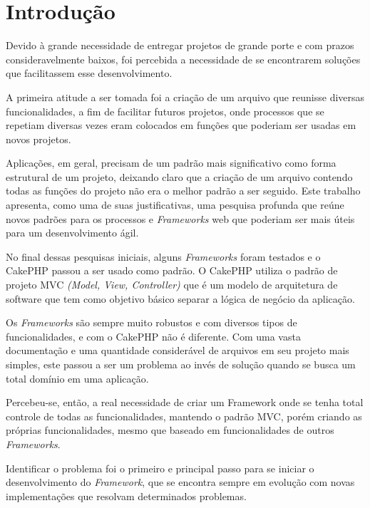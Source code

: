 \chapter{Introdução\label{cap:introducao}}
    Devido à grande necessidade de entregar projetos de grande porte e com prazos consideravelmente baixos, foi percebida a necessidade de se encontrarem soluções que facilitassem esse desenvolvimento.

    A primeira atitude a ser tomada foi a criação de um arquivo que reunisse diversas funcionalidades, a fim de facilitar futuros projetos, onde processos que se repetiam diversas vezes eram colocados em funções que poderiam ser usadas em novos projetos.

    Aplicações, em geral, precisam de um padrão mais significativo como forma estrutural de um projeto, deixando claro que a criação de um arquivo contendo todas as funções do projeto não era o melhor padrão a ser seguido. Este trabalho apresenta, como uma de suas justificativas, uma pesquisa profunda que reúne novos padrões para os processos e \emph{Frameworks} web que poderiam ser mais úteis para um desenvolvimento ágil.

    No final dessas pesquisas iniciais, alguns \emph{Frameworks} foram testados e o CakePHP passou a ser usado como padrão. O CakePHP utiliza o padrão de projeto MVC \emph{(Model, View, Controller)} que é um modelo de arquitetura de software que tem como objetivo básico separar a lógica de negócio da aplicação.

    Os \emph{Frameworks} são sempre muito robustos e com diversos tipos de funcionalidades, e com o CakePHP não é diferente. Com uma vasta documentação e uma quantidade considerável de arquivos em seu projeto mais simples, este passou a ser um problema ao invés de solução quando se busca um total domínio em uma aplicação.

    Percebeu-se, então, a real necessidade de criar um Framework onde se tenha total controle de todas as funcionalidades, mantendo o padrão MVC, porém criando as próprias funcionalidades, mesmo que baseado em funcionalidades de outros \emph{Frameworks}.

    Identificar o problema foi o primeiro e principal passo para se iniciar o desenvolvimento do \emph{Framework}, que se encontra sempre em evolução com novas implementações que resolvam determinados problemas.
